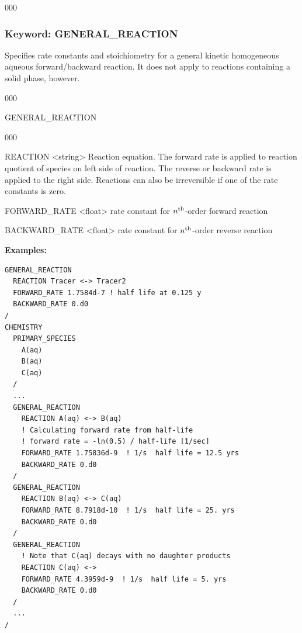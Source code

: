 \begin{deflist}{000}
\subsubsection{Keyword: GENERAL\_REACTION}
Specifies rate constants and stoichiometry for a general kinetic homogeneous aqueous forward/backward reaction. It does not apply to reactions containing a solid phase, however.

\hfill\hyperlink{target_key}{\return}

\begin{deflist}{000}
\item[GENERAL\_REACTION] ~

\begin{deflist}{000}

\item [REACTION] <string>
Reaction equation. The forward rate is applied to reaction quotient of species on left side of reaction. The reverse or backward rate is applied to the right side. Reactions can also be irreversible if one of the rate constants is zero.

\item [FORWARD\_RATE] <float>
rate constant for $n^{\rm th}$-order forward reaction 
\item [BACKWARD\_RATE] <float>
rate constant for $n^{\rm th}$-order reverse reaction 
\end{deflist}
\item[\keyend]
\end{deflist}

\begin{mdframed}
{\bf Examples:}
\footnotesize
\begin{verbatim}
GENERAL_REACTION
  REACTION Tracer <-> Tracer2
  FORWARD_RATE 1.7584d-7 ! half life at 0.125 y
  BACKWARD_RATE 0.d0
/
CHEMISTRY
  PRIMARY_SPECIES
    A(aq)
    B(aq)
    C(aq)
  /
  ...
  GENERAL_REACTION
    REACTION A(aq) <-> B(aq)
    ! Calculating forward rate from half-life
    ! forward rate = -ln(0.5) / half-life [1/sec]
    FORWARD_RATE 1.75836d-9  ! 1/s  half life = 12.5 yrs
    BACKWARD_RATE 0.d0
  /
  GENERAL_REACTION
    REACTION B(aq) <-> C(aq)
    FORWARD_RATE 8.7918d-10  ! 1/s  half life = 25. yrs
    BACKWARD_RATE 0.d0
  /
  GENERAL_REACTION
    ! Note that C(aq) decays with no daughter products
    REACTION C(aq) <->
    FORWARD_RATE 4.3959d-9  ! 1/s  half life = 5. yrs
    BACKWARD_RATE 0.d0
  /
  ...
/
\end{verbatim}
\normalsize
\end{mdframed}


\end{deflist}
